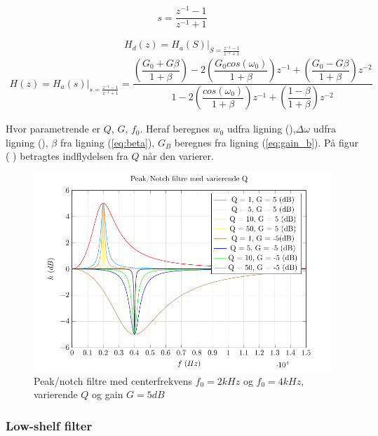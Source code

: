     \begin{align}
    s =   \dfrac{z^{-1} - 1}{z^{-1} + 1}
    \end{align}

    \begin{equation}
    H_d(z) = H_a(S)\bigg|_{S = \frac{z^{-1} -1 }{z^{-1} + 1}}
    \end{equation}
   \begin{align}
    H(z) = H_a(s)\bigg|_{s = \frac{z^{-1} -1 }{z^{-1} + 1}} = 
    \dfrac{\left(\dfrac{G_0 + G \beta}{1 + \beta} \right)- 2 \left(\dfrac{G_0 cos( \omega_0)}{1 +\beta} \right)z^{-1} + \left(\dfrac{ G_0 - G \beta}{1 + \beta }\right) z^{-2}}{1 - 2 \left(\dfrac{cos(\omega_0)}{1 + \beta}\right)z^{-1} + \left( \dfrac{1 - \beta}{1 + \beta} \right) z^{-2}}
   \end{align}

   Hvor parametrende er $Q$, $G$, $f_0$. Heraf beregnes $w_0$ udfra ligning (),$\Delta \omega$ udfra ligning (), $\beta$ fra ligning (\ref{eq:beta}), $G_B$ beregnes fra ligning (\ref{eq:gain_b}).
   På figur (
       ) betragtes indflydelsen fra $Q$ når den varierer.

 \begin{figure}[h]
    \centering
         \includegraphics{figure/iir_peak.pdf}
        \caption{Peak/notch filtre med centerfrekvens $f_0 = 2kHz$ og $f_0 = 4kHz$, varierende $Q$ og gain $G=5dB$}
        \label{fig:iir_peak}
    \end{figure} 


     \subsubsection{Low-shelf filter}

